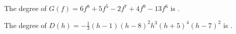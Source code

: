 \documentclass{ximera}
\begin{document}
\begin{exercise}
\begin{question}
\end{question}













\begin{question}


The degree of $G(f) = 6f^8 + 5f^5 - 2f^7 + 4f^9 - 13f^6$ is .

\end{question}




\begin{question}


The degree of $D(h) = -\frac{1}{3} (h - 1) (h - 8)^2 h^3 (h + 5)^4 (h - 7)^2$ is .

\end{question}















\end{exercise}
\end{document}

